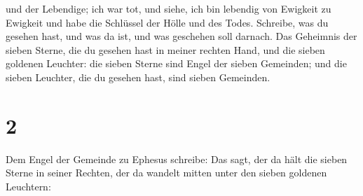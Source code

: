  und der Lebendige; ich war tot, und siehe, ich bin
lebendig von Ewigkeit zu Ewigkeit und habe die Schlüssel der Hölle und
des Todes.  Schreibe, was du gesehen hast, und was da ist,
und was geschehen soll darnach.  Das Geheimnis der sieben
Sterne, die du gesehen hast in meiner rechten Hand, und die sieben
goldenen Leuchter: die sieben Sterne sind Engel der sieben Gemeinden;
und die sieben Leuchter, die du gesehen hast, sind sieben Gemeinden.

\hypertarget{section-1}{%
\section{2}\label{section-1}}

 Dem Engel der Gemeinde zu Ephesus schreibe: Das sagt, der
da hält die sieben Sterne in seiner Rechten, der da wandelt mitten unter
den sieben goldenen Leuchtern:


